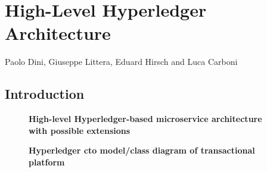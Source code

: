 \chapter{High-Level Hyperledger Architecture}
\label{ch:hl}

\vspace{-1cm}
\begin{center}
Paolo Dini, Giuseppe Littera, Eduard Hirsch and Luca Carboni
\end{center}

\section{Introduction}






\begin{figure}[h]
\centering
{}
\caption{\bf \small High-level Hyperledger-based microservice architecture with possible extensions}
\label{fig:HL_Architecture}
\end{figure}



\begin{figure}[h]
\centering
{}
\caption{\bf \small Hyperledger cto model/class diagram of transactional platform}
\label{fig:DCN}
\end{figure}







